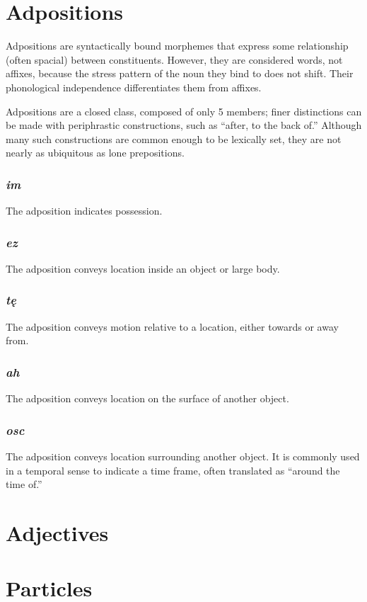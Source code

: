 \setchapterpreamble[u]{\margintoc}
\chapter{Adpositions}
Adpositions are syntactically bound morphemes that express some relationship (often spacial) between constituents. However, they are considered words, not affixes, because the stress pattern of the noun they bind to does not shift.  Their phonological independence differentiates them from affixes.

Adpositions are a closed class, composed of only 5 members; finer distinctions can be made with periphrastic constructions, such as  “after, to the back of.” Although many such constructions are common enough to be lexically set, they are not nearly as ubiquitous as lone prepositions.

\subsection{\textit{im}}
The adposition  indicates possession.

\subsection{\textit{ez}}
The adposition  conveys location inside an object or large body.

\subsection{\textit{tę}}
The adposition  conveys motion relative to a location, either towards or away from.

\subsection{\textit{ah}}
The adposition  conveys location on the surface of another object.

\subsection{\textit{osc}}
The adposition  conveys location surrounding another object. It is commonly used in a temporal sense to indicate a time frame, often translated as “around the time of.”

\setchapterpreamble[u]{\margintoc}
\chapter{Adjectives}

\setchapterpreamble[u]{\margintoc}
\chapter{Particles}